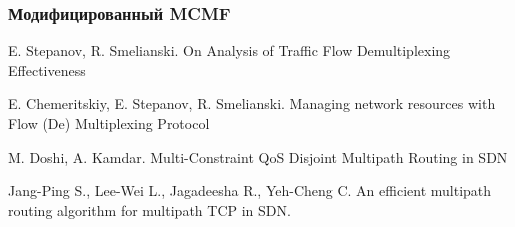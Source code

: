 \documentclass[a4paper]{article}
\begin{document}
\subsubsection{Модифицированный MCMF \cite{stepsmel}}





\newpage
\begin{thebibliography}{3}
E. Stepanov, R. Smelianski. On Analysis of Traffic Flow Demultiplexing Effectiveness

E. Chemeritskiy, E. Stepanov, R. Smelianski. Managing network resources with Flow (De) Multiplexing Protocol

M. Doshi, A. Kamdar. Multi-Constraint QoS Disjoint Multipath Routing in SDN

Jang-Ping S., Lee-Wei L., Jagadeesha R., Yeh-Cheng C. An efficient multipath routing algorithm for multipath TCP in SDN.
\end{thebibliography}
\end{document}
